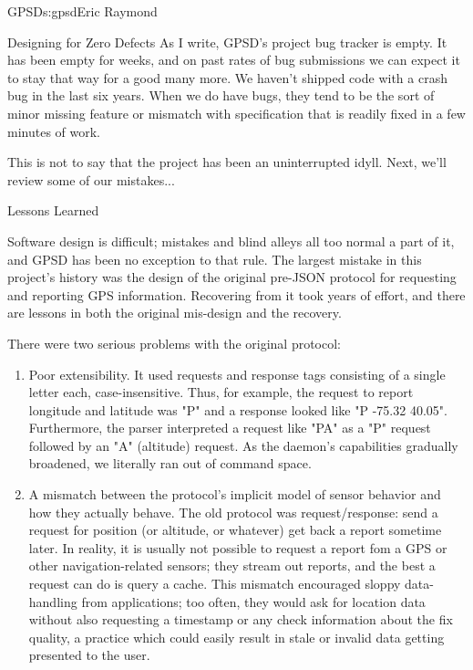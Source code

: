 \begin{aosachapter}{GPSD}{s:gpsd}{Eric Raymond}
\begin{aosasect1}{Designing for Zero Defects}
As I write, GPSD's project bug tracker is empty.  It has been empty
for weeks, and on past rates of bug submissions we can expect it to
stay that way for a good many more.  We haven't shipped code with a
crash bug in the last six years.  When we do have bugs, they tend to
be the sort of minor missing feature or mismatch with specification
that is readily fixed in a few minutes of work.

This is not to say that the project has been an uninterrupted idyll.  
Next, we'll review some of our mistakes...

\end{aosasect1}

\begin{aosasect1}{Lessons Learned}

Software design is difficult; mistakes and blind alleys all too normal
a part of it, and GPSD has been no exception to that rule.  The
largest mistake in this project's history was the design of the
original pre-JSON protocol for requesting and reporting GPS
information.  Recovering from it took years of effort, and there are
lessons in both the original mis-design and the recovery.

There were two serious problems with the original protocol:

\begin{enumerate}

  \item Poor extensibility.  It used requests and response tags
    consisting of a single letter each, case-insensitive. Thus, for
    example, the request to report longitude and latitude was "P" and
    a response looked like "P -75.32 40.05". Furthermore, the parser
    interpreted a request like "PA" as a "P" request followed by an
    "A" (altitude) request.  As the daemon's capabilities gradually
    broadened, we literally ran out of command space.

  \item A mismatch between the protocol's implicit model of sensor
    behavior and how they actually behave.  The old protocol was
    request/response: send a request for position (or altitude, or
    whatever) get back a report sometime later. In reality, it is
    usually not possible to request a report fom a GPS or other
    navigation-related sensors; they stream out reports, and the best
    a request can do is query a cache.  This mismatch encouraged
    sloppy data-handling from applications; too often, they would ask
    for location data without also requesting a timestamp or any check
    information about the fix quality, a practice which could easily
    result in stale or invalid data getting presented to the user.


\end{enumerate}
\end{aosasect1}
\end{aosachapter}
